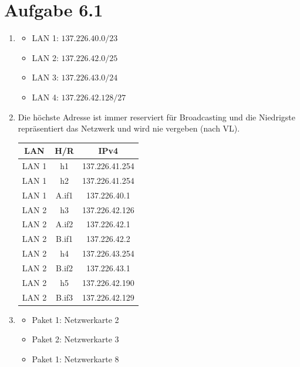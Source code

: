 \documentclass[12pt, a4paper]{article}
\begin{document}
\section*{Aufgabe 6.1}
\begin{enumerate}[label=\alph*)]
	\item	\begin{itemize}
				\item	LAN 1: $137.226.40.0/23$
				\item	LAN 2: $137.226.42.0/25$
				\item	LAN 3: $137.226.43.0/24$
				\item	LAN 4: $137.226.42.128/27$
			\end{itemize}
	\item	Die höchste Adresse ist immer reserviert für Broadcasting und die Niedrigste repräsentiert das Netzwerk und wird nie vergeben (nach VL).\\
			
			\begin{center}\begin{tabular}{c|c|c}
				LAN & H/R & IPv4 \\
				\hline\hline
				LAN 1 & h1 & 137.226.41.254 \\
				LAN 1 & h2 & 137.226.41.254 \\
				LAN 1 & A.if1 & 137.226.40.1 \\
				\hline
				LAN 2 & h3 & 137.226.42.126 \\
				LAN 2 & A.if2 & 137.226.42.1 \\
				LAN 2 & B.if1 & 137.226.42.2 \\
				\hline
				LAN 2 & h4 & 137.226.43.254 \\
				LAN 2 & B.if2 & 137.226.43.1 \\
				\hline
				LAN 2 & h5 & 137.226.42.190 \\
				LAN 2 & B.if3 & 137.226.42.129 \\
			
			\end{tabular}\end{center}
	\item	\begin{itemize}
				\item	Paket 1: Netzwerkarte 2
				\item	Paket 2: Netzwerkarte 3
				\item	Paket 1: Netzwerkarte 8
			\end{itemize}
\end{enumerate}
\end{document}

